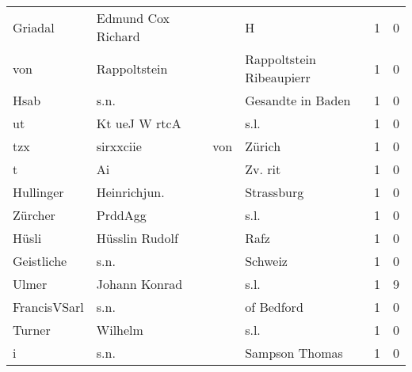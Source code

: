 \begin{tabular}{llllrr}
                  Griadal &                 Edmund Cox Richard &             &                                           H &          1 &         0 \\
                      von &                       Rappoltstein &             &                    Rappoltstein Ribeaupierr &          1 &         0 \\
                     Hsab &                               s.n. &             &                           Gesandte in Baden &          1 &         0 \\
                       ut &                      Kt ueJ W rtcA &             &                                        s.l. &          1 &         0 \\
                      tzx &                          sirxxciie &         von &                                      Zürich &          1 &         0 \\
                        t &                                 Ai &             &                                     Zv. rit &          1 &         0 \\
                Hullinger &                       Heinrichjun. &             &                                  Strassburg &          1 &         0 \\
                  Zürcher &                            PrddAgg &             &                                        s.l. &          1 &         0 \\
                    Hüsli &                     Hüsslin Rudolf &             &                                        Rafz &          1 &         0 \\
               Geistliche &                               s.n. &             &                                     Schweiz &          1 &         0 \\
                    Ulmer &                      Johann Konrad &             &                                        s.l. &          1 &         9 \\
             FrancisVSarl &                               s.n. &             &                                  of Bedford &          1 &         0 \\
                   Turner &                            Wilhelm &             &                                        s.l. &          1 &         0 \\
                        i &                               s.n. &             &                              Sampson Thomas &          1 &         0 \\

\end{tabular}
